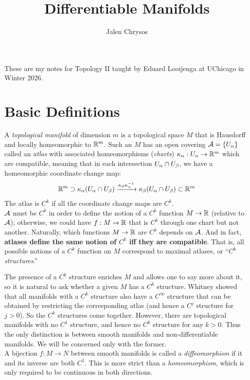 \documentclass{amsart}
\title{Differentiable Manifolds}
\author{Jalen Chrysos}
\begin{document}
	
\maketitle

These are my notes for Topology II taught by Eduard Looijenga at UChicago in Winter 2026.

\tableofcontents

\newpage 

\section{Basic Definitions}

A \textit{topological manifold} of dimension $m$ is a topological space $M$ that is Hausdorff and locally homeomorphic to $\mathbb{R}^m$. Such an $M$ has an open covering $\mathcal{A} = \{U_{\alpha}\}$ called an \textit{atlas} with associated homeomorphisms (\textit{charts}) $\kappa_{\alpha}:U_{\alpha}\to \mathbb{R}^m$ which are compatible, meaning that in each intersection $U_{\alpha}\cap U_{\beta}$, we have a homeomorphic coordinate change map:
$$
\mathbb{R}^m \supset \kappa_{\alpha}(U_{\alpha}\cap U_{\beta}) \xrightarrow{\kappa_{\beta}\kappa_{\alpha}^{-1}} \kappa_{\beta}(U_{\alpha}\cap U_{\beta}) \subset \mathbb{R}^m
$$
The atlas is $C^k$ if all the coordinate change maps are $C^k$.\\

$\mathcal{A}$ must be $C^k$ in order to define the notion of a $C^k$ function $M\to \mathbb{R}$ (relative to $\mathcal{A}$); otherwise, we could have $f:M\to \mathbb{R}$ that is $C^k$ through one chart but not another. Naturally, which functions $M\to \mathbb{R}$ are $C^k$ depends on $\mathcal{A}$. And in fact, \textbf{atlases define the same notion of $C^k$ iff they are compatible}. That is, all possible notions of a $C^k$ function on $M$ correspond to maximal atlases, or ``$C^k$ \textit{structures}.''

The presence of a $C^k$ structure enriches $M$ and allows one to say more about it, so it is natural to ask whether a given $M$ has a $C^k$ structure. Whitney showed that all manifolds with a $C^k$ structure also have a $C^{\infty}$ structure that can be obtained by restricting the corresponding atlas (and hence a $C^j$ structure for $j>0$). So the $C^k$ structures come together. However, there are topological manifolds with no $C^1$ structure, and hence no $C^k$ structure for any $k>0$. Thus the only distinction is between smooth manifolds and non-differentiable manifolds. We will be concerned only with the former.\\

A bijection $f:M\to N$ between smooth manifolds is called a \textit{diffeomorphism} if it and its inverse are both $C^1$. This is more strict than a \textit{homeomorphism}, which is only required to be continuous in both directions.
\end{document}
